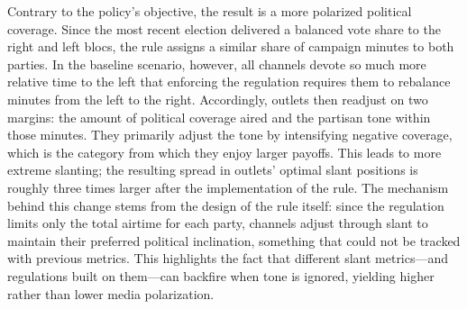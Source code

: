 \documentclass[12pt]{article}
\begin{document}
Contrary to the policy's objective, the result is a more polarized political coverage. Since the most recent election delivered a balanced vote share to the right and left blocs, the rule assigns a similar share of campaign minutes to both parties. In the baseline scenario, however,  all channels devote so much more relative time to the left that enforcing the regulation requires them to rebalance minutes from the left to the right. Accordingly, outlets then readjust on two margins:  the amount of political coverage  aired and the partisan tone within those minutes. They primarily adjust the tone  by intensifying negative coverage, which is the category from which they enjoy larger payoffs. This leads to more extreme slanting; the resulting spread in outlets’ optimal slant positions is roughly three times larger after the implementation of the rule. The mechanism behind this change stems from the design of the rule itself: since the regulation limits only the total airtime for each party, channels adjust through slant to maintain their preferred political inclination, something that could not be tracked with previous metrics.  This highlights the fact that different slant metrics—and regulations built on them—can backfire when tone is ignored, yielding higher rather than lower media polarization.
\end{document}
